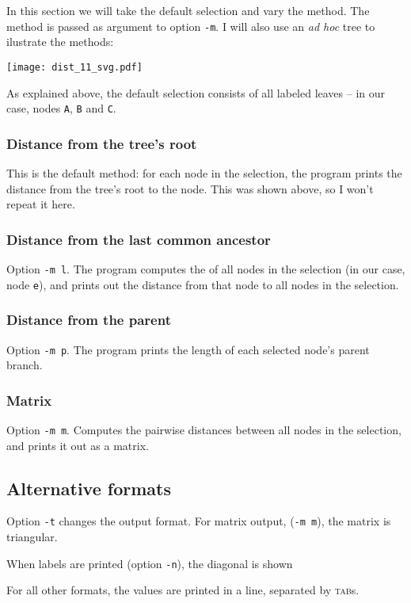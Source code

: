 In this section we will take the default selection and vary the method. The
method is passed as argument to option \texttt{-m}. I will also use an
\emph{ad hoc} tree to ilustrate the methods:


\begin{center}
\texttt{[image: dist\_11\_svg.pdf]}
\end{center}

\noindent{}As explained above, the default selection consists of all labeled
leaves -- in our case, nodes \texttt{A}, \texttt{B} and \texttt{C}. 

\subsubsection{Distance from the tree's root}

This is the default method: for each node in the selection, the program prints
the distance from the tree's root to the node. This was shown above, so I
won't repeat it here.

\subsubsection{Distance from the last common ancestor}
Option \texttt{-m l}. The program computes the \lca{} of all nodes in the
selection (in our case, node \texttt{e}), and prints out the distance from
that node to all nodes in the selection.



\subsubsection{Distance from the parent}
Option \texttt{-m p}. The program prints the length of each selected node's
parent branch.



\subsubsection{Matrix}
Option \texttt{-m m}. Computes the pairwise distances between all nodes in the
selection, and prints it out as a matrix.



\subsection{Alternative formats}

Option \texttt{-t} changes the output format. For matrix output, (\texttt{-m
m}), the matrix is triangular. 


When labels are printed (option \texttt{-n}), the diagonal is shown



For all other formats, the values are printed in a line, separated by
\textsc{tab}s.


